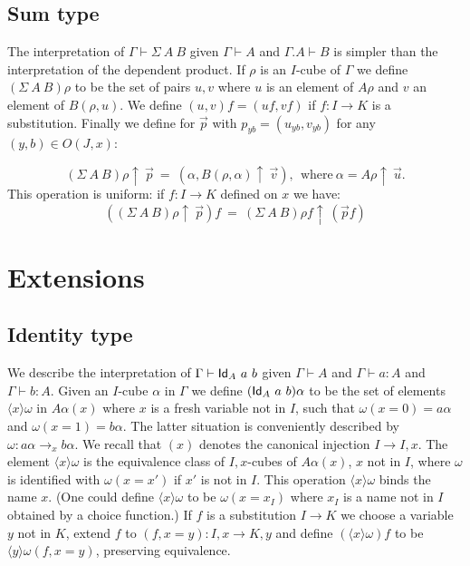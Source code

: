 \documentclass[10pt,a4paper]{article}
\newcommand{\Id}{{\sf Id}}
\newcommand{\rup}[1]{#1{\uparrow}}
\newcommand{\bind}[2]{{\langle}#1{\rangle}#2}
\begin{document}
\subsection{Sum type}

 The interpretation of $\Gamma\vdash\Sigma~A~B$ given $\Gamma\vdash A$ and $\Gamma.A\vdash B$
is simpler than the interpretation of the dependent product. If $\rho$ is an $I$-cube
of $\Gamma$ we define $(\Sigma~A~B)\rho$ to be the set of pairs $u,v$ where $u$ is
an element of $A\rho$ and $v$ an element of $B(\rho,u)$. We define $(u,v)f = (uf,vf)$
if $f:I\to K$ is a substitution. Finally we define for $\vec p$
with $p_{yb}=(u_{yb},v_{yb})$ for any $(y,b)\in O(J,x)$:

$$(\rup{\Sigma~A~B)\rho}~\vec{p}~=~ (\alpha, \rup{B(\rho,\alpha)}~\vec{v}),~~
\text{where}~\alpha = \rup{A\rho}~ \vec u.$$
This operation is uniform: if $f:I\to K$ defined on $x$ we have:
$$(\rup{(\Sigma~A~B)\rho}~\vec{p})f~=~\rup{(\Sigma~A~B)\rho f}~(\vec{p}f)$$

\medskip

\section{Extensions}

\subsection{Identity type}

We describe the interpretation of $\Gamma\vdash\Id_A~a~b$ given
$\Gamma\vdash A$ and $\Gamma\vdash a:A$ and $\Gamma\vdash b:A$. Given
an $I$-cube $\alpha$ in $\Gamma$ we define $(\Id_A~a~b)\alpha$ to be
the set of elements $\bind{x}{\omega}$ in $A\alpha(x)$ where $x$ is a
fresh variable not in $I$, such that $\omega(x=0) = a\alpha$ and
$\omega(x=1) = b\alpha$. The latter situation is conveniently
described by $\omega: a\alpha\to_x b\alpha$.  We recall that $(x)$ denotes
the canonical injection $I \to I,x$. The element $\bind{x}{\omega}$ is
the equivalence class of $I,x$-cubes of $A\alpha(x)$, $x$ not in $I$,
where $\omega$ is identified with $\omega(x=x')$ if $x'$ is not in
$I$. This operation $\bind{x}{\omega}$ binds the name $x$.  (One could
define $\bind{x}{\omega}$ to be $\omega(x = x_I)$ where $x_I$ is a
name not in $I$ obtained by a choice function.) If $f$ is a
substitution $I \to K$ we choose a variable $y$ not in $K$, extend $f$
to $(f,x=y): I,x \to K,y$ and define $(\bind{x}{\omega}) f$ to be
$\bind{y}{\omega (f,x=y)}$, preserving equivalence.
\end{document}
